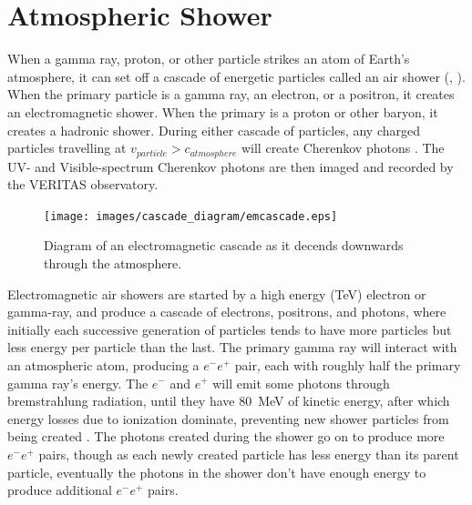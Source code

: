 \section{Atmospheric Shower}

  When a gamma ray, proton, or other particle strikes an atom of Earth's atmosphere, it can set off a cascade of energetic particles called an air shower (\cite{Bethe1934}, \cite{Klein1999}).
  When the primary particle is a gamma ray, an electron, or a positron, it creates an electromagnetic shower.
  When the primary is a proton or other baryon, it creates a hadronic shower.
  During either cascade of particles, any charged particles travelling at $v_{particle} > c_{atmosphere}$ will create Cherenkov photons \cite{cherenkov}.
  The UV- and Visible-spectrum Cherenkov photons are then imaged and recorded by the VERITAS observatory.

  \begin{figure}[ht]
    \centering
    \texttt{[image: images/cascade\_diagram/emcascade.eps]}
    \caption[Electromagnetic Cascade]{
      Diagram of an electromagnetic cascade as it decends downwards through the atmosphere.
    }
    \label{fig:emcascade}
  \end{figure}

  Electromagnetic air showers are started by a high energy (\nicetilde TeV) electron or gamma-ray, and produce a cascade of electrons, positrons, and photons, where initially each successive generation of particles tends to have more particles but less energy per particle than the last.
  The primary gamma ray will interact with an atmospheric atom, producing a $e^{-}e^{+}$ pair, each with roughly half the primary gamma ray's energy.
  The $e^{-}$ and $e^{+}$ will emit some photons through bremstrahlung radiation, until they have \nicetilde \SI{80}{MeV} of kinetic energy, after which energy losses due to ionization dominate, preventing new shower particles from being created \cite{pdg_2014}.
  The photons created during the shower go on to produce more $e^{-}e^{+}$ pairs, though as each newly created particle has less energy than its parent particle, eventually the photons in the shower don't have enough energy to produce additional $e^{-}e^{+}$ pairs.

